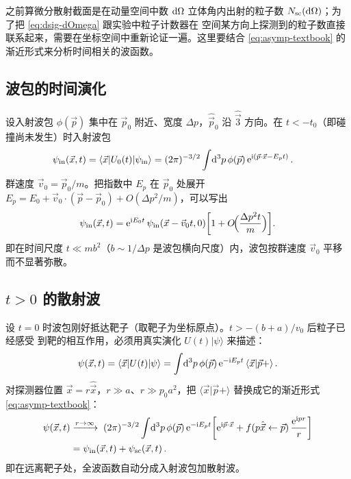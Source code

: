 之前算微分散射截面是在动量空间中数 $\mathrm{d}\Omega$ 立体角内出射的粒子数
$N_{\text{sc}}(\mathrm{d}\Omega)$；为了把 \eqref{eq:dsig-dOmega} 跟实验中粒子计数器在
空间某方向上探测到的粒子数直接联系起来，需要在坐标空间中重新论证一遍。这里要结合
\eqref{eq:asymp-textbook} 的渐近形式来分析时间相关的波函数。

\subsection{波包的时间演化}

设入射波包 $\phi(\vec p)$ 集中在 $\vec p_0$ 附近、宽度 $\Delta p$，$\hat{\vec
p}_0$ 沿 $\hat{\vec 3}$ 方向。在 $t<-t_0$（即碰撞尚未发生）时入射波包
\begin{align}
  \psi_{\text{in}}(\vec x,t)
  &= \langle\vec x|U_0(t)|\psi_{\text{in}}\rangle
   = (2\pi)^{-3/2}\int\!\mathrm{d}^3 p\,\phi(\vec p)\,\mathrm{e}^{\mathrm{i}(\vec p\cdot\vec x-E_p t)}\,.
\end{align}
群速度 $\vec v_0 = \vec p_0/m$。把指数中 $E_p$ 在 $\vec p_0$ 处展开
$E_p = E_0 + \vec v_0\cdot(\vec p-\vec p_0) + O(\Delta p^2/m)$，可以写出
\begin{equation}
  \psi_{\text{in}}(\vec x,t) = \mathrm{e}^{\mathrm{i} E_0 t}\,\psi_{\text{in}}(\vec x-\vec v_0 t,0)
  \!\left[1+O\!\Big(\frac{\Delta p^2 t}{m}\Big)\right]\!.
  \label{eq:packet-shift}
\end{equation}
即在时间尺度 $t\ll mb^2$（$b\sim 1/\Delta p$ 是波包横向尺度）内，波包按群速度
$\vec v_0$ 平移而不显著弥散。

\subsection{$t>0$ 的散射波}

设 $t=0$ 时波包刚好抵达靶子（取靶子为坐标原点）。$t > -(b+a)/v_0$ 后粒子已经感受
到靶的相互作用，必须用真实演化 $U(t)|\psi\rangle$ 来描述：
\begin{equation}
  \psi(\vec x,t) = \langle\vec x|U(t)|\psi\rangle
  = \int\!\mathrm{d}^3 p\,\phi(\vec p)\,\mathrm{e}^{-\mathrm{i} E_p t}\,\langle\vec x|\vec p+\rangle\,.
\end{equation}
对探测器位置 $\vec x = r\hat{\vec x}$，$r\gg a$、$r\gg p_0 a^2$，把
$\langle\vec x|\vec p+\rangle$ 替换成它的渐近形式 \eqref{eq:asymp-textbook}：
\begin{align}
  \psi(\vec x,t)
  &\xrightarrow{r\to\infty}\;
  (2\pi)^{-3/2}\int\!\mathrm{d}^3p\,\phi(\vec p)\,\mathrm{e}^{-\mathrm{i} E_p t}
  \!\left[\mathrm{e}^{\mathrm{i}\vec p\cdot\vec x}
  + f(p\hat{\vec x}\leftarrow\vec p)\,\frac{\mathrm{e}^{\mathrm{i} pr}}{r}\right]\nonumber\\
  &= \psi_{\text{in}}(\vec x,t) + \psi_{\text{sc}}(\vec x,t)\,.
\end{align}
即在远离靶子处，全波函数自动分成入射波包加散射波。

